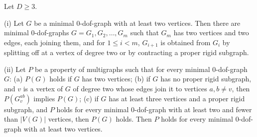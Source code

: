 \begin{theorem}
  \label{thm:minimal-kdof-reduction}
  \leanok
  Let $D \ge 3$.

  \textup{(i)} Let $G$ be a minimal $0$-dof-graph with at least two
  vertices. Then there are minimal $0$-dof-graphs
  $G = G_1, G_2, \dots, G_m$ such that $G_m$ has two vertices and two
  edges, each joining them, and for $1 \le i < m$, $G_{i+1}$ is obtained
  from $G_i$ by splitting off at a vertex of degree two or by contracting
  a proper rigid subgraph.

  \textup{(ii)} Let $P$ be a property of multigraphs such that for every
  minimal $0$-dof-graph $G$: (a) $P(G)$ holds if $G$ has two vertices;
  (b) if $G$ has no proper rigid subgraph, and $v$ is a vertex of $G$ of
  degree two whose edges join it to vertices $a, b \neq v$, then
  $P(G_v^{ab})$ implies $P(G)$; (c) if $G$ has at least three vertices
  and a proper rigid subgraph, and $P$ holds for every minimal
  $0$-dof-graph with at least two and fewer than $|V(G)|$ vertices, then
  $P(G)$ holds. Then $P$ holds for every minimal $0$-dof-graph with at
  least two vertices.
\end{theorem}
